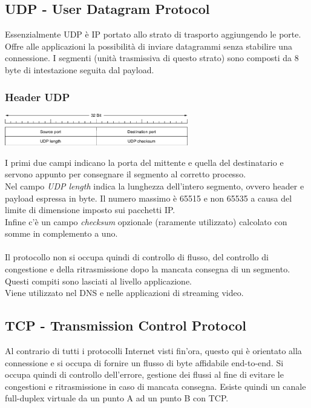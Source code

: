 \documentclass[10pt,a4paper,twoside]{article}
\begin{document}
\subsection{UDP - User Datagram Protocol}
Essenzialmente UDP è IP portato allo strato di trasporto aggiungendo le porte. Offre alle applicazioni la possibilità di inviare datagrammi senza stabilire una connessione. I segmenti (unità trasmissiva di questo strato) sono composti da 8 byte di intestazione seguita dal payload.
\subsubsection{Header UDP}
\begin{center}
\includegraphics[width=0.6\textwidth]{images/header_udp.png}
\end{center}
I primi due campi indicano la porta del mittente e quella del destinatario e servono appunto per consegnare il segmento al corretto processo.\\
Nel campo \textit{UDP length} indica la lunghezza dell'intero segmento, ovvero header e payload espressa in byte. Il numero massimo è 65515 e non 65535 a causa del limite di dimensione imposto sui pacchetti IP.\\
Infine c'è un campo \textit{checksum} opzionale (raramente utilizzato) calcolato con somme in complemento a uno.\\\\
Il protocollo non si occupa quindi di controllo di flusso, del controllo di congestione e della ritrasmissione dopo la mancata consegna di un segmento. Questi compiti sono lasciati al livello applicazione.\\
Viene utilizzato nel DNS e nelle applicazioni di streaming video.

\subsection{TCP - Transmission Control Protocol}
Al contrario di tutti i protocolli Internet visti fin'ora, questo qui è orientato alla connessione e si occupa di fornire un flusso di byte affidabile end-to-end. Si occupa quindi di controllo dell'errore, gestione dei flussi al fine di evitare le congestioni e ritrasmissione in caso di mancata consegna. Esiste quindi un canale full-duplex virtuale da un punto A ad un punto B con TCP.
\end{document}

